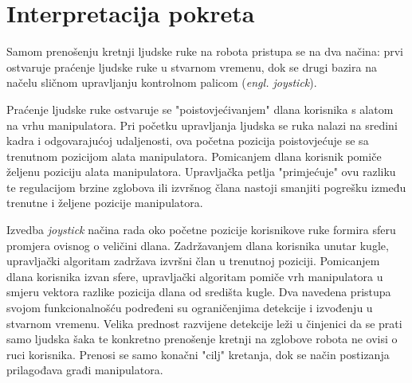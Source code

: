\documentclass[times, utf8, diplomski, numeric]{fer}
\begin{document}

\section{Interpretacija pokreta}\label{2_1}
Samom prenošenju kretnji ljudske ruke na robota pristupa se na dva načina: prvi ostvaruje praćenje ljudske ruke u stvarnom vremenu, dok se drugi bazira na načelu sličnom upravljanju kontrolnom palicom (\textit{engl. joystick}).

Praćenje ljudske ruke ostvaruje se "poistovjećivanjem" dlana korisnika s alatom na vrhu manipulatora. 
Pri početku upravljanja ljudska se ruka nalazi na sredini kadra i odgovarajućoj udaljenosti, ova početna pozicija poistovjećuje se sa trenutnom pozicijom alata manipulatora.
Pomicanjem dlana korisnik pomiče željenu poziciju alata manipulatora.
Upravljačka petlja "primjećuje" ovu razliku te regulacijom brzine zglobova ili izvršnog člana nastoji smanjiti pogrešku između trenutne i željene pozicije manipulatora.

Izvedba \textit{joystick} načina rada oko početne pozicije korisnikove ruke formira sferu promjera ovisnog o veličini dlana.
Zadržavanjem dlana korisnika unutar kugle, upravljački algoritam zadržava izvršni član u trenutnoj poziciji.
Pomicanjem dlana korisnika izvan sfere, upravljački algoritam pomiče vrh manipulatora u smjeru vektora razlike pozicija dlana od središta kugle.
Dva navedena pristupa svojom funkcionalnošću podređeni su ograničenjima detekcije i izvođenju u stvarnom vremenu.
Velika prednost razvijene detekcije leži u činjenici da se prati samo ljudska šaka te konkretno prenošenje kretnji na zglobove robota ne ovisi o ruci korisnika.
Prenosi se samo konačni "cilj" kretanja, dok se način postizanja prilagođava građi manipulatora.
\end{document}
